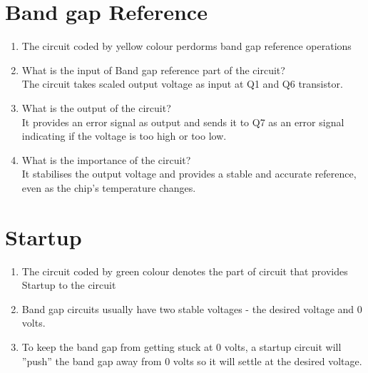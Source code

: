 \documentclass[journal,12pt,twocolumn]{IEEEtran}
\renewcommand\thesection{\arabic{section}}
\begin{document}
\section{Band gap Reference}
\begin{enumerate}[label=\thesection.\arabic*,ref=\thesection.\theenumi]
\item The circuit coded by yellow colour perdorms band gap reference operations
\item  What is the input of Band gap reference part of the circuit?\\
\solution
The circuit takes scaled output voltage as input at Q1 and Q6 transistor. 
\item  What is the output of the circuit?\\
\solution 
It provides an error signal as output and sends it to Q7 as an error signal indicating if the voltage is too high or too low.
\item What is the importance of the circuit?\\
\solution
It stabilises the output voltage and provides a stable and accurate reference, even as the chip's temperature changes.
\end{enumerate}

\section{Startup}
\begin{enumerate}[label=\thesection.\arabic*,ref=\thesection.\theenumi]
\item The circuit coded by green colour denotes the part of circuit that provides Startup to the circuit
\item Band gap circuits usually have two stable voltages - the
desired voltage and 0 volts.
\item To keep the band gap from getting stuck at 0 volts, a startup
circuit will ”push” the band gap away from 0 volts so it will
settle at the desired voltage.
\end {enumerate}
\end{document}
